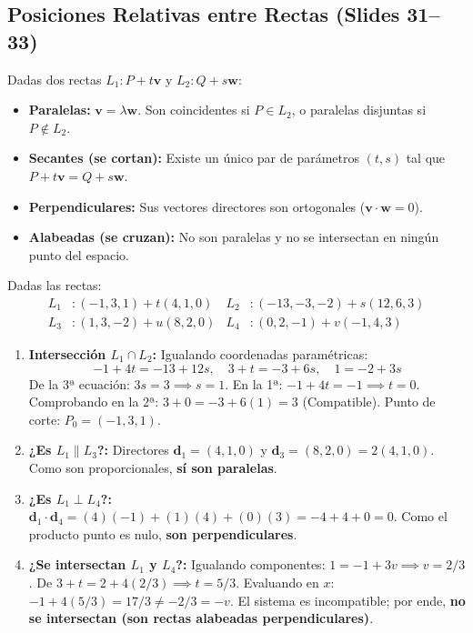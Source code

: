 \documentclass[10pt,letterpaper]{article}
\newcommand{\vv}{\mathbf{v}}
\newcommand{\vw}{\mathbf{w}}
\begin{document}
\subsection{Posiciones Relativas entre Rectas (Slides 31--33)}
Dadas dos rectas $L_1: P + t\vv$ y $L_2: Q + s\vw$:
\begin{itemize}
    \item \textbf{Paralelas:} $\vv = \lambda\vw$. Son coincidentes si $P \in L_2$, o paralelas disjuntas si $P \notin L_2$.
    \item \textbf{Secantes (se cortan):} Existe un único par de parámetros $(t, s)$ tal que $P + t\vv = Q + s\vw$.
    \item \textbf{Perpendiculares:} Sus vectores directores son ortogonales ($\vv \cdot \vw = 0$).
    \item \textbf{Alabeadas (se cruzan):} No son paralelas y no se intersectan en ningún punto del espacio.
\end{itemize}

\begin{cajaEjemplo}
Dadas las rectas:
\begin{align*}
L_1&: (-1, 3, 1) + t(4, 1, 0) & L_2&: (-13, -3, -2) + s(12, 6, 3) \\
L_3&: (1, 3, -2) + u(8, 2, 0) & L_4&: (0, 2, -1) + v(-1, 4, 3)
\end{align*}
\begin{enumerate}
    \item \textbf{Intersección $L_1 \cap L_2$:} Igualando coordenadas paramétricas:
    \[
    -1 + 4t = -13 + 12s, \quad 3 + t = -3 + 6s, \quad 1 = -2 + 3s
    \]
    De la 3ª ecuación: $3s = 3 \implies s = 1$. En la 1ª: $-1 + 4t = -1 \implies t = 0$. Comprobando en la 2ª: $3 + 0 = -3 + 6(1) = 3$ (Compatible). Punto de corte: $P_0 = (-1, 3, 1)$.
    \item \textbf{¿Es $L_1 \parallel L_3$?:} Directores $\mathbf{d}_1 = (4, 1, 0)$ y $\mathbf{d}_3 = (8, 2, 0) = 2(4, 1, 0)$. Como son proporcionales, \textbf{sí son paralelas}.
    \item \textbf{¿Es $L_1 \perp L_4$?:} $\mathbf{d}_1 \cdot \mathbf{d}_4 = (4)(-1) + (1)(4) + (0)(3) = -4 + 4 + 0 = 0$. Como el producto punto es nulo, \textbf{son perpendiculares}.
    \item \textbf{¿Se intersectan $L_1$ y $L_4$?:} Igualando componentes: $1 = -1 + 3v \implies v = 2/3$. De $3 + t = 2 + 4(2/3) \implies t = 5/3$. Evaluando en $x$: $-1 + 4(5/3) = 17/3 \neq -2/3 = -v$. El sistema es incompatible; por ende, \textbf{no se intersectan (son rectas alabeadas perpendiculares)}.
\end{enumerate}
\end{cajaEjemplo}
\end{document}

